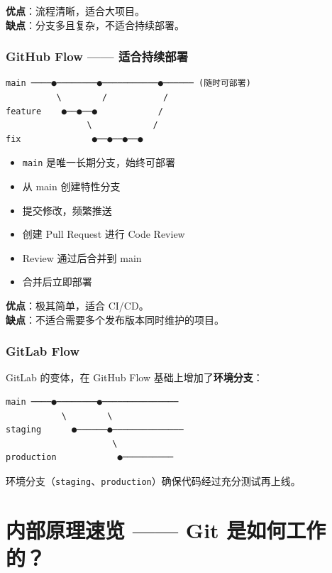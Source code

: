 \documentclass[12pt,a4paper]{article}
\begin{document}
\textbf{优点}：流程清晰，适合大项目。\\
\textbf{缺点}：分支多且复杂，不适合持续部署。

\subsubsection{GitHub Flow —— 适合持续部署}

\begin{lstlisting}[numbers=none]
main ────●────────●───────────●────── (随时可部署)
          \        /           /
feature    ●──●──●            /
                \            /
fix              ●──●──●──●
\end{lstlisting}

\begin{itemize}[itemsep=3pt]
    \item \texttt{main} 是唯一长期分支，始终可部署
    \item 从 main 创建特性分支
    \item 提交修改，频繁推送
    \item 创建 Pull Request 进行 Code Review
    \item Review 通过后合并到 main
    \item 合并后立即部署
\end{itemize}

\textbf{优点}：极其简单，适合 CI/CD。\\
\textbf{缺点}：不适合需要多个发布版本同时维护的项目。

\subsubsection{GitLab Flow}

GitLab 的变体，在 GitHub Flow 基础上增加了\textbf{环境分支}：

\begin{lstlisting}[numbers=none]
main ────●────────●───────────────
           \        \
staging      ●──────●──────────────
                     \
production            ●──────────
\end{lstlisting}

环境分支（\texttt{staging}、\texttt{production}）确保代码经过充分测试再上线。

\section{内部原理速览 —— Git 是如何工作的？}
\end{document}
